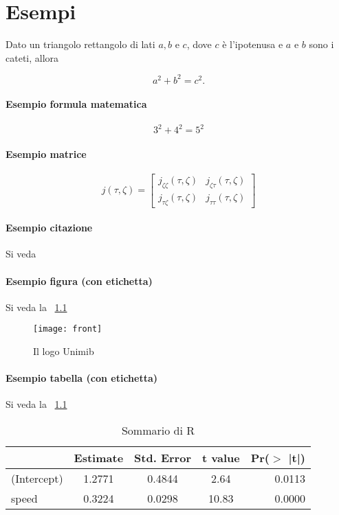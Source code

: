 
\chapter{Esempi}


\begin{theorem} Dato un triangolo rettangolo di lati $a,b$ e $c$, dove $c$ è l'ipotenusa e $a$ e $b$ sono i cateti, allora

$$
a^2 + b^2 = c^2.
$$

\end{theorem}

\subsubsection{Esempio formula matematica}
\begin{equation}
3^2+4^2=5^2
\end{equation}


\subsubsection{Esempio matrice}
\begin{equation}
j(\tau,\zeta) = \begin{bmatrix}
j_{\zeta \zeta}(\tau,\zeta) & j_{\zeta \tau}(\tau,\zeta) \\
j_{\tau \zeta}(\tau,\zeta) &  j_{\tau \tau}(\tau,\zeta)    
\end{bmatrix}
\end{equation}


\subsubsection{Esempio citazione}
Si veda \citet{pacesalvan}


\subsubsection{Esempio figura (con etichetta)}
Si veda la \figurename~\ref{logo}
\begin{figure}[htbp]
\begin{center}
\texttt{[image: front]}
\caption{Il logo Unimib \label{logo}}
\end{center}
\end{figure}

\subsubsection{Esempio tabella (con etichetta)}
Si veda la \tablename~\ref{tab}
\begin{table}[htbp]
\caption{Sommario di R  \label{tab}}
\centering
\begin{tabular}{lcccr}
  \toprule
 & Estimate & Std. Error & t value & Pr($>$  |t|) \\ 
  \midrule
(Intercept) & 1.2771 & 0.4844 & 2.64 & 0.0113 \\ 
  speed & 0.3224 & 0.0298 & 10.83 & 0.0000 \\ 
   \bottomrule
\end{tabular}
\end{table}
